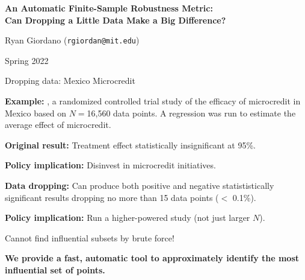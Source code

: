 
\begin{frame}

\begin{center}
\large
\textbf{
An Automatic Finite-Sample Robustness Metric:
\\Can Dropping a Little Data Make a Big Difference?}
\end{center}

\hrulefill
\vspace{1em}

Ryan Giordano (\texttt{rgiordan@mit.edu})\footnotemark[1]

Spring 2022


\end{frame}


\begin{frame}[t]{Dropping data: Mexico Microcredit}


\vspace{1em} \textbf{Example:} \citet{angelucci2015microcredit}, a randomized
controlled trial study of the efficacy of microcredit in Mexico based on $N =
$16,560 data points. A regression was run to estimate the average effect of
microcredit.

\hrulefill

\vspace{1em}
\textbf{Original result: }
Treatment effect statistically insignificant at 95\%.

\vspace{1em}
\textbf{Policy implication: } Disinvest in microcredit initiatives.

\hrulefill

\pause

\vspace{1em} \textbf{Data dropping: } Can produce both positive and negative
statististically significant results dropping no more than 15 data points
($<$ 0.1\%).

\vspace{1em}
\textbf{Policy implication: } Run a higher-powered study (not just
larger $N$).


\hrulefill

\pause

Cannot find influential subsets by brute force!

\vspace{1em}
\textbf{We provide a fast, automatic tool to  approximately identify the
most influential set of points.}


\end{frame}



